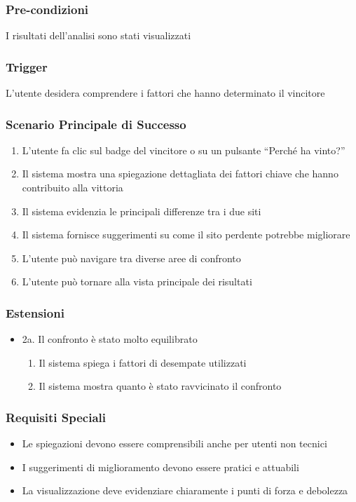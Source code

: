 \subsubsection{Pre-condizioni}
I risultati dell'analisi sono stati visualizzati

\subsubsection{Trigger}
L'utente desidera comprendere i fattori che hanno determinato il vincitore

\subsubsection{Scenario Principale di Successo}
\begin{enumerate}
    \item L'utente fa clic sul badge del vincitore o su un pulsante ``Perché ha vinto?''
    \item Il sistema mostra una spiegazione dettagliata dei fattori chiave che hanno contribuito alla vittoria
    \item Il sistema evidenzia le principali differenze tra i due siti
    \item Il sistema fornisce suggerimenti su come il sito perdente potrebbe migliorare
    \item L'utente può navigare tra diverse aree di confronto
    \item L'utente può tornare alla vista principale dei risultati
\end{enumerate}

\subsubsection{Estensioni}
\begin{itemize}
    \item 2a. Il confronto è stato molto equilibrato
    \begin{enumerate}
        \item Il sistema spiega i fattori di desempate utilizzati
        \item Il sistema mostra quanto è stato ravvicinato il confronto
    \end{enumerate}
\end{itemize}

\subsubsection{Requisiti Speciali}
\begin{itemize}
    \item Le spiegazioni devono essere comprensibili anche per utenti non tecnici
    \item I suggerimenti di miglioramento devono essere pratici e attuabili
    \item La visualizzazione deve evidenziare chiaramente i punti di forza e debolezza
\end{itemize}

